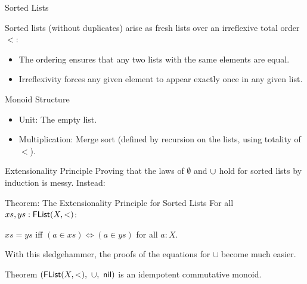 \documentclass[aspectratio=169]{beamer}
\newcommand{\union}{\AgdaFunction{$\cup$}}
\begin{document}
\begin{frame}{Sorted Lists}


  \bigskip

  Sorted lists (without duplicates) arise as fresh lists over an irreflexive total order $<$:
\begin{itemize}
        \smallskip
  \item The ordering ensures that any two lists with the same elements are equal.
        \smallskip

  \item Irreflexivity forces any given element to appear exactly once in any given list.
\end{itemize}

\bigskip

\begin{block}{Monoid Structure}
  \begin{itemize}
          \item Unit: The empty list.
    \item Multiplication: Merge sort (defined by recursion on the lists, using totality of $<$).
        \smallskip
  \end{itemize}
\end{block}
\end{frame}


\begin{frame}{Extensionality Principle}
  Proving that the laws of $\emptyset$ and $\union$ hold for sorted lists by induction is messy. Instead:

  \bigskip

\begin{block}{Theorem: The Extensionality Principle for Sorted Lists}
  For all $xs, ys : \AgdaDatatype{FList}(X,<)$:

  \begin{center}
    $xs = ys$ iff $(a \in xs) \iff (a \in ys)$ for all $a : X$.
  \end{center}
\end{block}

\bigskip

With this sledgehammer, the proofs of the equations for $\cup$ become much easier.

\bigskip

\begin{block}{Theorem}
  $(\AgdaDatatype{FList}(X,<),~\cup,~\mathsf{nil})$ is an idempotent commutative monoid.
\end{block}

\end{frame}
\end{document}
